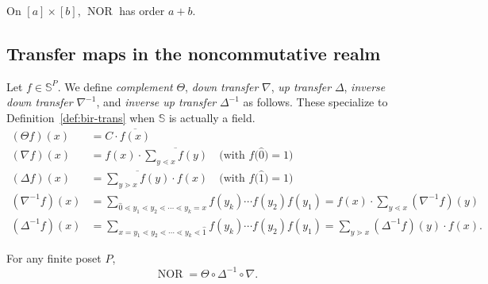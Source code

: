 \documentclass[ALCO,ThmDefs,Unicode,epreuves]{cedram}
\newcommand{\defn}[1]{\emph{#1}}
\newcommand{\bbs}{\mathbb{S}}
\newcommand{\down}{\nabla}
\newcommand{\up}{\Delta}
\DeclareMathOperator{\NOR}{NOR}
\begin{document}
\begin{conj}\label{conj:NOR-prod-chains}
On $[a]\times[b]$, $\NOR$ has order $a+b$.
\end{conj}

\subsection{Transfer maps in the noncommutative realm}

\begin{defi}
Let $f\in\bbs^P$. We define \defn{complement} $\Theta$, \defn{down transfer} $\down$, \defn{up
transfer} $\up$, \defn{inverse down transfer} $\down^{-1}$, and \defn{inverse up transfer}
$\up^{-1}$ 
as follows. 
These specialize to Definition~\ref{def:bir-trans} when $\bbs$ is actually a field.
\begin{align*}
 (\Theta f)(x) &= C \cdot \overline{f(x)}\\
 (\down f)(x) &= f(x) \cdot \overline{\sum\limits_{y\lessdot x}f(y)} \quad \big(\text{with } f\big(\widehat{0}\big)=1\big)\\
 (\up f)(x) &= 
 \overline{\sum\limits_{y\gtrdot x}f(y)} \cdot f(x) \quad \big(\text{with } f\big(\widehat{1}\big)=1\big)\\
 \left(\down^{-1}f\right)(x) &=
 \sum_{\widehat{0}\lessdot y_1\lessdot y_2 \lessdot \cdots \lessdot y_k=x} f(y_k)\cdots f(y_2)f(y_1) 
 =f(x) \cdot \sum\limits_{y\lessdot x}\left(\down^{-1}f\right)(y)\\
 \left(\up^{-1}f\right)(x) &=
 \sum_{x=y_1\lessdot y_2 \lessdot \cdots \lessdot y_k\lessdot \widehat{1}} f(y_k)\cdots f(y_2)f(y_1)
 =\sum\limits_{y\gtrdot x}\left(\up^{-1}f\right)(y) \cdot f(x).
\end{align*}
\end{defi}

\begin{theo}\label{thm:NOR-transfer}
For any finite poset $P$, 
\[
\NOR=\Theta \circ \up^{-1} \circ \down.
\]
\end{theo}
\end{document}
